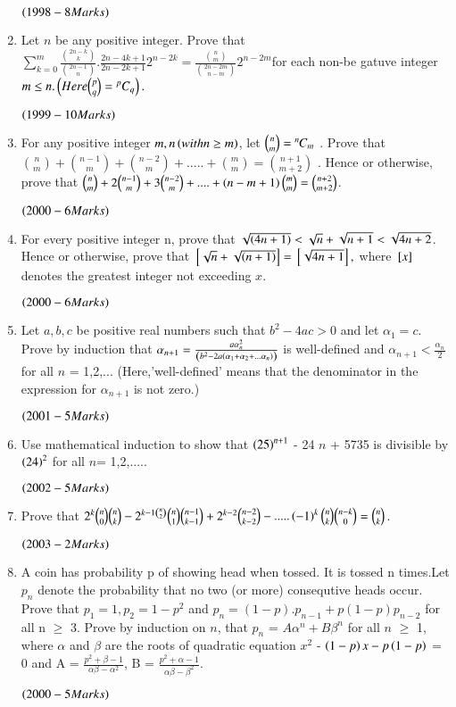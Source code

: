 \documentclass[journal,12pt,twocolumn]{IEEEtran}
\theoremstyle{remark}
\begin{document}
\begin{enumerate}[start=16]
$\hfill{\brak{1998-8 Marks} }$
\item 
Let $n$ be any positive integer. Prove that $\sum\limits^{m}_{k=0}\frac{\binom{2n-k}{k}}{\binom{2n-1}{n}}.\frac{2n-4k+1}{2n-2k+1}2^{n-2k}= \frac{\binom{n}{m}}{\binom{2n-2m}{n-m} } 2^{n-2m}$for each non-be gatuve integer $m\leq n. \left(Here \binom{p}{q} = {}^pC_q\right).$

$\hfill{\brak{1999-10 Marks} }$
\item
For any positive integer $m,n\left(with n \geq m\right)$, let $\binom{n}{m} ={{}^{n}\mkern-1muC_{m}}$ . Prove that $\binom{n}{m} + \binom{n-1}{m} + \binom{n-2}{m} + ..... + \binom{m}{m} = \binom{n+1}{m+2}$ . Hence or otherwise, prove that $\binom{n}{m} +2\binom{n-1}{m} +3\binom{n-2}{m}+....+ \left(n-m+1\right) \binom{m}{m} = \binom{n+2}{m+2}$.

$\hfill{\brak{2000-6 Marks} }$
\item
For every positive integer n, prove that $\sqrt{\left(4n+1\right)} < \sqrt{n} +\sqrt{n+1} < \sqrt{4n+2}$. Hence or otherwise, prove that ${}\left[\sqrt{n} + \sqrt{\left(n+1\right)}\right]= {}\left[\sqrt{4n+1}\right],$ where ${}\left[x\right]$ denotes the greatest integer not exceeding $x$.

$\hfill{\brak{2000-6 Marks} }$
\item
Let $a,b,c$ be positive real numbers such that $b^2 - 4ac > 0$ and let $\alpha_1 = c$. Prove by induction that $\alpha_{n+1} = \frac{a \alpha_{n}^2}{\left(b^2 - 2a \left(\alpha_1 + \alpha_2 + ... \alpha_n\right)\right)}$ is well-defined and $\alpha_{n+1} < \frac{\alpha_n}{2}$ for all $n$ = 1,2,...
		(Here,'well-defined' means that the denominator in the expression for $\alpha_{n+1}$ is not zero.)

$\hfill{\brak{2001-5 Marks} }$
\item
Use mathematical induction to show that $\left(25\right)^{n+1}$ - 24 $n$ + 5735 is divisible by $\left(24\right)^2$ for all $n$= 1,2,.....

$\hfill{\brak{2002-5 Marks} }$
\item 
Prove that $2^k \binom{n}{0}\binom{n}{k} - 2^{k-1\binom{n}{2}} \binom{n}{1} \binom{n-1}{k-1} + 2^{k-2}\binom{n-2}{k-2} - .....\left(-1\right)^k \binom{n}{k}\binom{n-k}{0} = \binom{n}{k}$.

$\hfill{\brak{2003-2 Marks} }$
\item
A coin has probability p of showing head when tossed. It is tossed n times.Let $p_n$ denote the probability that no two (or more) consequtive heads occur. Prove that $p_1=1 , p_2=1-p^2$ and $p_n = (1-p).p_{n-1} + p(1-p)p_{n-2}$ for all n $\geq$ 3. Prove by induction on $n$, that $p_n$ = $A\alpha^n + B\beta^n$ for all $n$ $\geq$ 1, where $\alpha$ and $\beta$ are the roots of quadratic equation $x^2$ - $\left(1-p\right)x - p\left(1-p\right)$ = 0 and A = $\frac{p^2 + \beta -1}{\alpha\beta-\alpha^2}$, B = $\frac{p^2 + \alpha -1}{\alpha\beta - \beta^2}$.

$\hfill{\brak{2000-5 Marks} }$



\end{enumerate}
\end{document}
